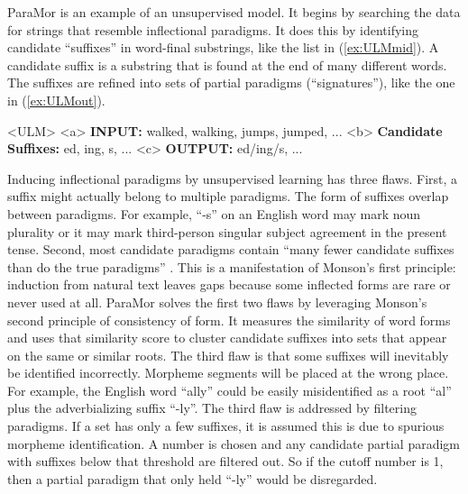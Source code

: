 \documentclass[12pt]{article}
\begin{document}
ParaMor \cite{monson_paramorMinimally_2007a} is an example of an unsupervised model. It begins by searching the data for strings that resemble inflectional paradigms. It does this by identifying candidate ``suffixes'' in word-final substrings, like the list in (\ref{ex:ULMmid}). A candidate suffix is a substring that is found at the end of many different words. The suffixes are refined into sets of partial paradigms (``signatures''), like the one in (\ref{ex:ULMout}). 

\begin{singlespace}
\pex<ULM>   
\label{ex:ULM}
\a<a> \textbf{INPUT:}  walked, walking, jumps, jumped, ...
\label{ex:ULMin}
\a<b> \textbf{Candidate Suffixes:} ed, ing, s, ...
\label{ex:ULMmid}
\a<c> \textbf{OUTPUT:} ed/ing/s, ...
\label{ex:ULMout}
\xe
\end{singlespace}

Inducing inflectional paradigms by unsupervised learning has three flaws. First, a suffix might actually belong to multiple paradigms. The form of suffixes overlap between paradigms. For example, ``-s'' on an English word may mark noun plurality or it may mark third-person singular subject agreement in the present tense. Second, most candidate paradigms contain ``many fewer candidate suffixes than do the true paradigms'' \cite[p. 903]{monson_paramorfinding_2007b}. This is a manifestation of Monson's first principle: induction from natural text leaves gaps because some inflected forms are rare or never used at all. ParaMor solves the first two flaws by leveraging Monson's second principle of consistency of form. It measures the similarity of word forms and uses that similarity score to cluster candidate suffixes into sets that appear on the same or similar roots. The third flaw is that some suffixes will inevitably be identified incorrectly. Morpheme segments will be placed at the wrong place. For example, the English word ``ally'' could be easily misidentified as a root ``al'' plus the adverbializing suffix  ``-ly''. The third flaw is addressed by filtering paradigms. If a set has only a few suffixes, it is assumed this is due to spurious morpheme identification. A number is chosen and any candidate partial paradigm with suffixes below that threshold are filtered out. So if the cutoff number is 1, then a partial paradigm that only held ``-ly'' would be disregarded.
\end{document}
